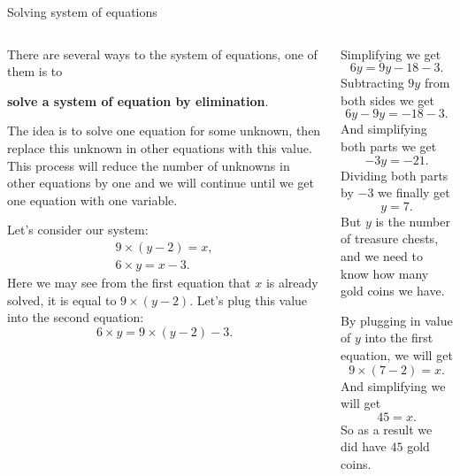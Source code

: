 \documentclass[9pt,aspectratio=169]{beamer}
\begin{document}
\begin{frame}{Solving system of equations}
  \begin{columns}[T]
    \begin{column}{0.5\textwidth}
      There are several ways to the system of equations, one of them is to 
      \begin{definition}
        \textbf{solve a system of equation by elimination}. 

        The idea is to solve one equation for some unknown, then replace this unknown in other equations with this value. This process will reduce the number of unknowns in other equations by one and we will continue until we get one equation with one variable.
      \end{definition}

      Let's consider our system:
      \begin{gather*}
        9 \times (y - 2) = x,\\
        6 \times y = x - 3.
      \end{gather*}
      Here we may see from the first equation that $x$ is already solved, it is equal to $ 9 \times (y - 2)$. Let's plug this value into the second equation:
      \[ 6 \times y = 9 \times (y - 2) - 3. \]  
    \end{column}
    \begin{column}{0.5\textwidth}
      Simplifying we get
      \[ 6y = 9y - 18 - 3. \]
      Subtracting $9y$ from both sides we get
      \[ 6y - 9y = - 18 - 3. \]
      And simplifying both parts we get
      \[ -3y = -21. \]
      Dividing both parts by $-3$ we finally get
      \[ y = 7. \]
      But $y$ is the number of treasure chests, and we need to know how many gold coins we have.

      By plugging in value of $y$ into the first equation, we will get
      \[ 9 \times (7 - 2) = x. \]
      And simplifying we will get 
      \[ 45 = x. \]
      So as a result we did have $45$ gold coins.
    \end{column}
  \end{columns}
\end{frame}
\end{document}
